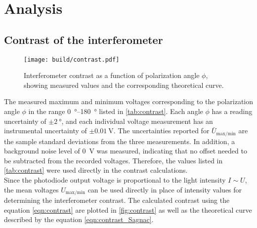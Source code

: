 \section{Analysis}
\label{sec:Analysis}

\subsection{Contrast of the interferometer}
\label{sec:Contrast}
\begin{figure}[h]
    \centering
    \texttt{[image: build/contrast.pdf]}
    \caption{Interferometer contrast as a function of polarization angle $\phi$, showing measured values and the corresponding theoretical curve.}
    \label{fig:contrast}
\end{figure}
The measured maximum and minimum voltages corresponding to the polarization angle $\phi$ in the range \SI{0}{\degree}–\SI{180}{\degree} listed in \autoref{tab:contrast}.
Each angle $\phi$ has a reading uncertainty of $\pm\SI{2}{\degree}$, and each individual voltage measurement has an instrumental uncertainty of $\pm\SI{0.01}{\volt}$.
The uncertainties reported for $\bar{U}_{\text{max/min}}$ are the sample standard deviations from the three measurements.
In addition, a background noise level of \SI{0}{\volt} was measured, indicating that no offset needed to be subtracted from the recorded voltages.
Therefore, the values listed in \autoref{tab:contrast} were used directly in the contrast calculations.\\
Since the photodiode output voltage is proportional to the light intensity $I \sim U$, the mean voltages $U_{\text{max/min}}$ can be used directly in place of intensity values for determining the interferometer contrast. 
The calculated contrast using the equation \ref{eqn:contrast} are plotted in \autoref{fig:contrast} as well as the theoretical curve described by the equation \ref{eqn:contrast_Sagnac}.
